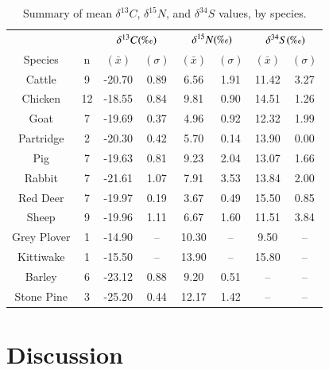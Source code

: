 \documentclass[preprint, 3p, authoryear]{elsarticle} %
\begin{document}
\begin{longtable}[t]{cccccccc}
\caption{\label{tab:table5}Summary of mean \(\delta ^{13}C\), \(\delta ^{15}N\), and \(\delta ^{34}S\) values, by species.}\\
\toprule
\multicolumn{2}{c}{ } & \multicolumn{2}{c}{\(\delta ^{13}C (\text{\textperthousand})\)} & \multicolumn{2}{c}{\(\delta ^{15}N (\text{\textperthousand})\)} & \multicolumn{2}{c}{\(\delta ^{34}S (\text{\textperthousand})\)} \\
\cmidrule(l{3pt}r{3pt}){3-4} \cmidrule(l{3pt}r{3pt}){5-6} \cmidrule(l{3pt}r{3pt}){7-8}
Species & n & $(\bar{x})$ & $(\sigma)$ & $(\bar{x})$ & $(\sigma)$ & $(\bar{x})$ & $(\sigma)$\\
\midrule
Cattle & 9 & -20.70 & 0.89 & 6.56 & 1.91 & 11.42 & 3.27\\
Chicken & 12 & -18.55 & 0.84 & 9.81 & 0.90 & 14.51 & 1.26\\
Goat & 7 & -19.69 & 0.37 & 4.96 & 0.92 & 12.32 & 1.99\\
Partridge & 2 & -20.30 & 0.42 & 5.70 & 0.14 & 13.90 & 0.00\\
Pig & 7 & -19.63 & 0.81 & 9.23 & 2.04 & 13.07 & 1.66\\
Rabbit & 7 & -21.61 & 1.07 & 7.91 & 3.53 & 13.84 & 2.00\\
Red Deer & 7 & -19.97 & 0.19 & 3.67 & 0.49 & 15.50 & 0.85\\
Sheep & 9 & -19.96 & 1.11 & 6.67 & 1.60 & 11.51 & 3.84\\
Grey Plover & 1 & -14.90 & -- & 10.30 & -- & 9.50 & --\\
Kittiwake & 1 & -15.50 & -- & 13.90 & -- & 15.80 & --\\
Barley & 6 & -23.12 & 0.88 & 9.20 & 0.51 & -- & --\\
Stone Pine & 3 & -25.20 & 0.44 & 12.17 & 1.42 & -- & --\\
\bottomrule
\end{longtable}
\endgroup{}

\hypertarget{discussion}{%
\section{Discussion}\label{discussion}}
\end{document}
